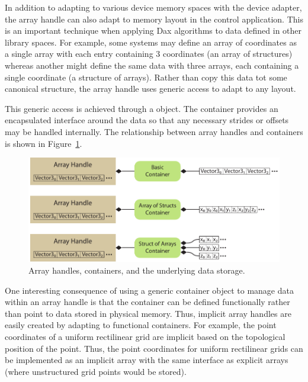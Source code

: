 In addition to adapting to various device memory spaces with the device
adapter, the array handle can also adapt to memory layout in the control
application. This is an important technique when applying Dax algorithms to
data defined in other library spaces. For example, some systems may define
an array of coordinates as a single array with each entry containing 3
coordinates (an array of structures) whereas another might define the same
data with three arrays, each containing a single coordinate (a structure of
arrays). Rather than copy this data tot some canonical structure, the array
handle uses generic access to adapt to any layout.


This generic access is achieved through a 
 object. The container provides an encapsulated
interface around the data so that any necessary strides or offsets may be
handled internally. The relationship between array handles and containers
is shown in Figure~\ref{fig:Containers}.

\begin{figure}[htb]
  \centering
  \includegraphics{images/Containers}
  \caption{Array handles, containers, and the underlying data storage.}
  \label{fig:Containers}
\end{figure}

One interesting consequence of using a generic container object to manage
data within an array handle is that the container can be defined
functionally rather than point to data stored in physical memory. Thus,
implicit array handles are easily created by adapting to functional
containers. For example, the point coordinates of a uniform rectilinear
grid are implicit based on the topological position of the point. Thus, the
point coordinates for uniform rectilinear grids can be implemented as an
implicit array with the same interface as explicit arrays (where
unstructured grid points would be stored).

